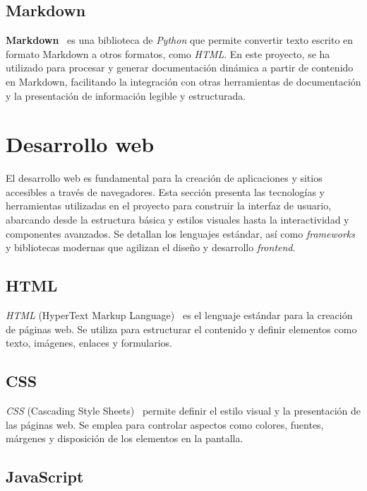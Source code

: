 \subsection{Markdown}

\textbf{Markdown}~\cite{web:markdown} es una biblioteca de \textit{Python} que permite convertir texto escrito en formato Markdown a 
otros formatos, como \textit{HTML}. En este proyecto, se ha utilizado para procesar y generar documentación dinámica a partir de 
contenido en Markdown, facilitando la integración con otras herramientas de documentación y la presentación de información 
legible y estructurada.

\section{Desarrollo web}

El desarrollo web es fundamental para la creación de aplicaciones y sitios accesibles a través de navegadores. 
Esta sección presenta las tecnologías y herramientas utilizadas en el proyecto para construir la interfaz de usuario, 
abarcando desde la estructura básica y estilos visuales hasta la interactividad y componentes avanzados. 
Se detallan los lenguajes estándar, así como \textit{frameworks} y bibliotecas modernas que agilizan 
el diseño y desarrollo \textit{frontend}.

\subsection{HTML}

\textit{HTML} (HyperText Markup Language)~\cite{web:html} es el lenguaje estándar para la creación de páginas web. 
Se utiliza para estructurar el contenido y definir elementos como texto, imágenes, enlaces y formularios.

\subsection{CSS}

\textit{CSS} (Cascading Style Sheets)~\cite{web:css} permite definir el estilo visual y la presentación de las páginas web. 
Se emplea para controlar aspectos como colores, fuentes, márgenes y disposición de los elementos en la pantalla.

\subsection{JavaScript}

